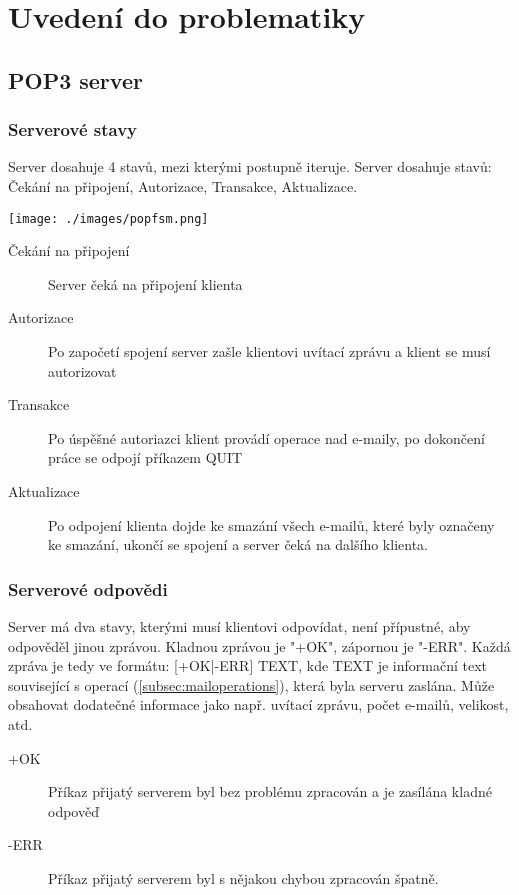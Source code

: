 \documentclass[11pt,a4paper]{report}
\begin{document}
    \clearpage
    \section{Uvedení do problematiky}
    \subsection{POP3 server}
    \label{subsec:pop3server}
    \subsubsection{Serverové stavy}
    \label{subsec:serverstatus}
    Server dosahuje 4 stavů, mezi kterými postupně iteruje. Server dosahuje stavů: Čekání na připojení, Autorizace, Transakce, Aktualizace.
    \begin{center}
        \texttt{[image: ./images/popfsm.png]}
    \end{center}
    \begin{description}
        \item [Čekání na připojení] Server čeká na připojení klienta
        \item [Autorizace] Po započetí spojení server zašle klientovi uvítací zprávu a klient se musí autorizovat
        \item [Transakce] Po úspěšné autoriazci klient provádí operace nad e-maily, po dokončení práce se odpojí příkazem QUIT
        \item [Aktualizace] Po odpojení klienta dojde ke smazání všech e-mailů, které byly označeny ke smazání, ukončí se spojení a server čeká na dalšího klienta.
    \end{description}
    \subsubsection{Serverové odpovědi}
    \label{subsec:commresponse}
    Server má dva stavy, kterými musí klientovi odpovídat, není přípustné, aby odpověděl jinou zprávou. Kladnou zprávou je "+OK", zápornou je "-ERR". Každá zpráva je tedy ve formátu: [+OK|-ERR] TEXT, kde TEXT je informační text související s operací (\ref{subsec:mailoperations}), která byla serveru zaslána. Může obsahovat dodatečné informace jako např. uvítací zprávu, počet e-mailů, velikost, atd.
    \begin{description}
        \item[+OK] Příkaz přijatý serverem byl bez problému zpracován a je zasílána kladné odpověď
        \item[-ERR] Příkaz přijatý serverem byl s nějakou chybou zpracován špatně.
    \end{description}
\end{document}
